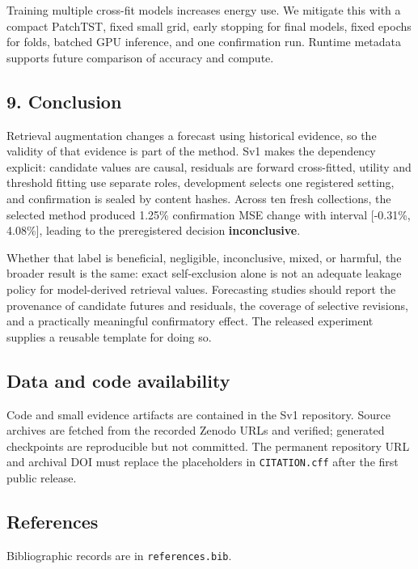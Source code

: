 \documentclass[
]{article}
\begin{document}
Training multiple cross-fit models increases energy use. We mitigate
this with a compact PatchTST, fixed small grid, early stopping for final
models, fixed epochs for folds, batched GPU inference, and one
confirmation run. Runtime metadata supports future comparison of
accuracy and compute.

\subsection{9. Conclusion}\label{9-conclusion}

Retrieval augmentation changes a forecast using historical evidence, so
the validity of that evidence is part of the method. Sv1 makes the
dependency explicit: candidate values are causal, residuals are forward
cross-fitted, utility and threshold fitting use separate roles,
development selects one registered setting, and confirmation is sealed
by content hashes. Across ten fresh collections, the selected method
produced 1.25\% confirmation MSE change with interval {[}-0.31\%,
4.08\%{]}, leading to the preregistered decision \textbf{inconclusive}.

Whether that label is beneficial, negligible, inconclusive, mixed, or
harmful, the broader result is the same: exact self-exclusion alone is
not an adequate leakage policy for model-derived retrieval values.
Forecasting studies should report the provenance of candidate futures
and residuals, the coverage of selective revisions, and a practically
meaningful confirmatory effect. The released experiment supplies a
reusable template for doing so.

\subsection{Data and code
availability}\label{data-and-code-availability}

Code and small evidence artifacts are contained in the Sv1 repository.
Source archives are fetched from the recorded Zenodo URLs and verified;
generated checkpoints are reproducible but not committed. The permanent
repository URL and archival DOI must replace the placeholders in
\texttt{CITATION.cff} after the first public release.

\subsection{References}\label{references}

Bibliographic records are in \texttt{references.bib}.
\end{document}
